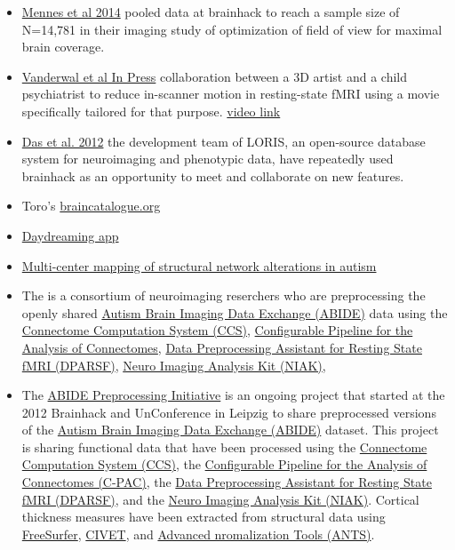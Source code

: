 \documentclass[11pt]{bmc_article_s50}
\begin{document}
\begin{itemize}
\item
  \cite{Mennes2014}
  \href{http://www.sciencedirect.com/science/article/pii/S1053811914002973}{Mennes
  et al 2014} pooled data at brainhack to reach a sample size of
  N=14,781 in their imaging study of optimization of field of view for
  maximal brain coverage.
\item
  \href{http://www.sciencedirect.com/science/article/pii/S1053811915006898}{Vanderwal
  et al In Press} collaboration between a 3D artist and a child
  psychiatrist to reduce in-scanner motion in resting-state fMRI using a
  movie specifically tailored for that purpose.
  \href{http://vimeo.com/67962604}{video link}
\item
  \href{http://journal.frontiersin.org/article/10.3389/fninf.2011.00037/abstract}{Das
  et al. 2012} the development team of LORIS, an open-source database
  system for neuroimaging and phenotypic data, have repeatedly used
  brainhack as an opportunity to meet and collaborate on new features.
\item
  Toro's \href{http://braincatalogue.org}{braincatalogue.org}
\item
  \href{http://daydreaming-the-app.net}{Daydreaming app}
\item
  \href{http://onlinelibrary.wiley.com/doi/10.1002/hbm.22776/full}{Multi-center
  mapping of structural network alterations in autism}
\item
  The is a consortium of neuroimaging reserchers who are preprocessing
  the openly shared
  \href{http://fcon_1000.projects.nitrc.org/indi/abide/}{Autism Brain
  Imaging Data Exchange (ABIDE)} data using the
  \href{http://www.google.com}{Connectome Computation System (CCS)},
  \href{http://fcp-indi.github,io}{Configurable Pipeline for the
  Analysis of Connectomes}, \href{http://www.google.com}{Data
  Preprocessing Assistant for Resting State fMRI (DPARSF)},
  \href{http://www.google.com}{Neuro Imaging Analysis Kit (NIAK)},
\item
  The
  \href{http://preprocessed-connectomes-project.github.io/abide}{ABIDE
  Preprocessing Initiative} is an ongoing project that started at the
  2012 Brainhack and UnConference in Leipzig to share preprocessed
  versions of the
  \href{http://fcon_1000.projects.nitrc.org/indi/abide}{Autism Brain
  Imaging Data Exchange (ABIDE)} dataset. This project is sharing
  functional data that have been processed using the
  \href{http://lfcd.psych.ac.cn/ccs.html}{Connectome Computation System
  (CCS)}, the \href{http://fcp-indi.github.io}{Configurable Pipeline for
  the Analysis of Connectomes (C-PAC)}, the
  \href{http://rfmri.org/DPARSF}{Data Preprocessing Assistant for
  Resting State fMRI (DPARSF)}, and the
  \href{https://www.nitrc.org/projects/niak/}{Neuro Imaging Analysis Kit
  (NIAK)}. Cortical thickness measures have been extracted from
  structural data using \href{http://freesurfer.net/}{FreeSurfer},
  \href{http://www.bic.mni.mcgill.ca/ServicesSoftware/CIVET}{CIVET}, and
  \href{http://picsl.upenn.edu/software/ants/}{Advanced nromalization
  Tools (ANTS)}.
\end{itemize}
\end{document}
